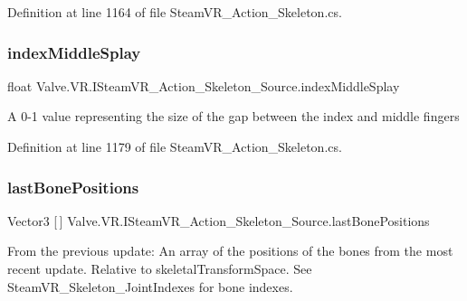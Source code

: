 Definition at line 1164 of file Steam\+V\+R\+\_\+\+Action\+\_\+\+Skeleton.\+cs.

\mbox{\label{interface_valve_1_1_v_r_1_1_i_steam_v_r___action___skeleton___source_a2862a4c4a23cf23cca1c354cd1c9daef}} 
\subsubsection{\texorpdfstring{indexMiddleSplay}{indexMiddleSplay}}
{\footnotesize\ttfamily float Valve.\+V\+R.\+I\+Steam\+V\+R\+\_\+\+Action\+\_\+\+Skeleton\+\_\+\+Source.\+index\+Middle\+Splay\hspace{0.3cm}{\ttfamily [get]}}



A 0-\/1 value representing the size of the gap between the index and middle fingers 



Definition at line 1179 of file Steam\+V\+R\+\_\+\+Action\+\_\+\+Skeleton.\+cs.

\mbox{\label{interface_valve_1_1_v_r_1_1_i_steam_v_r___action___skeleton___source_a7280f39174b242956481e88ca16bafe7}} 
\subsubsection{\texorpdfstring{lastBonePositions}{lastBonePositions}}
{\footnotesize\ttfamily Vector3 \mbox{[}$\,$\mbox{]} Valve.\+V\+R.\+I\+Steam\+V\+R\+\_\+\+Action\+\_\+\+Skeleton\+\_\+\+Source.\+last\+Bone\+Positions\hspace{0.3cm}{\ttfamily [get]}}



From the previous update\+: An array of the positions of the bones from the most recent update. Relative to skeletal\+Transform\+Space. See Steam\+V\+R\+\_\+\+Skeleton\+\_\+\+Joint\+Indexes for bone indexes. 



